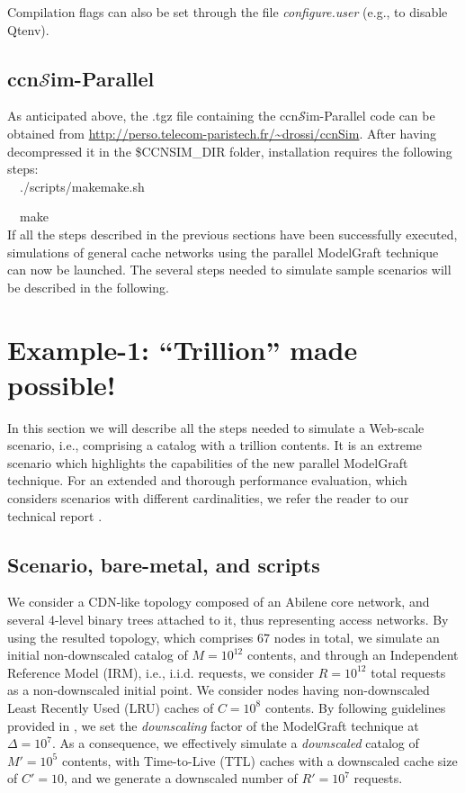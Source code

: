\documentclass[10pt]{article}
\newcommand{\ccnsim}{ccn\ensuremath{\mathcal{S}}im} %
\newcommand{\fakeacmpar}[1]{\vspace{2 mm}\noindent{\textbf{#1.}}}
\newcommand{\colorboxg}[1]{{\colorbox{gray!20}{#1}}}
\begin{document}
Compilation flags can also be set through the file \emph{configure.user} (e.g., to disable Qtenv).

\subsection*{\ccnsim-Parallel}

As anticipated above, the .tgz file containing the \ccnsim-Parallel code can be obtained from \url{http://perso.telecom-paristech.fr/~drossi/ccnSim}.
After having decompressed it in the \$CCNSIM\_DIR folder, installation requires the following steps: \\

\ \ \colorboxg{./scripts/makemake.sh}

\ \ \colorboxg{make} \\

If all the steps described in the previous sections have been successfully executed, simulations of general cache networks using the parallel ModelGraft technique can now be launched. The several steps needed to simulate sample scenarios will be described in the following.

\section*{Example-1: ``Trillion'' made possible!}
In this section we will describe all the steps needed to simulate a Web-scale scenario, i.e., comprising a catalog with a trillion contents. It is an extreme scenario which highlights the capabilities of the new parallel ModelGraft technique. For an extended and thorough performance evaluation, which considers scenarios with different cardinalities, we refer the reader to our technical report \cite{pMG_techRep}. 

\subsection*{Scenario, bare-metal, and scripts}
\fakeacmpar{Scenario} We consider a CDN-like topology composed of an Abilene core network, and several 4-level binary trees attached to it, thus representing access networks. 
By using the resulted topology, which comprises 67 nodes in total, we simulate an initial non-downscaled catalog of $M=10^{12}$ contents, and through an Independent Reference Model (IRM), i.e., i.i.d. requests, we consider $R=10^{12}$ total requests as a non-downscaled initial point. 
We consider nodes having non-downscaled Least Recently Used (LRU) caches of $C=10^{8}$ contents.
By following guidelines provided in \cite{tortelli-comnet:17}, we set the \emph{downscaling} factor of the ModelGraft technique at $\Delta=10^7$. 
As a consequence, we effectively simulate a \emph{downscaled} catalog of $M'=10^5$ contents, with Time-to-Live (TTL) caches with a downscaled cache size of $C'=10$, and we generate a downscaled number of $R'=10^7$ requests.  
\end{document}
